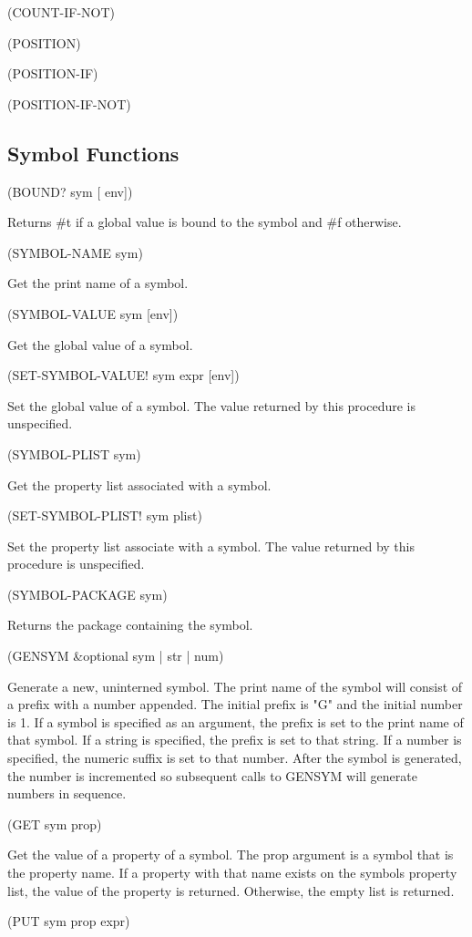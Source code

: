 \documentclass[11pt]{article}
\begin{document}
(COUNT-IF-NOT)

(POSITION)

(POSITION-IF)

(POSITION-IF-NOT)
\subsection{Symbol Functions}
\label{sec-1-18}

(BOUND? sym [ env])

Returns \#t if a global value is bound to the symbol and \#f otherwise.

(SYMBOL-NAME sym)

Get the print name of a symbol.

(SYMBOL-VALUE sym [env])

Get the global value of a symbol.

(SET-SYMBOL-VALUE! sym expr [env])

Set the global value of a symbol. The value returned by this procedure
is unspecified.

(SYMBOL-PLIST sym)

Get the property list associated with a symbol.

(SET-SYMBOL-PLIST! sym plist)

Set the property list associate with a symbol. The value returned by
this procedure is unspecified.

(SYMBOL-PACKAGE sym)

Returns the package containing the symbol.

(GENSYM \&optional sym | str | num)

Generate a new, uninterned symbol. The print name of the symbol will
consist of a prefix with a number appended. The initial prefix is "G"
and the initial number is 1. If a symbol is specified as an argument,
the prefix is set to the print name of that symbol. If a string is
specified, the prefix is set to that string. If a number is specified,
the numeric suffix is set to that number. After the symbol is generated,
the number is incremented so subsequent calls to GENSYM will generate
numbers in sequence.

(GET sym prop)

Get the value of a property of a symbol. The prop argument is a symbol
that is the property name. If a property with that name exists on the
symbols property list, the value of the property is returned. Otherwise,
the empty list is returned.

(PUT sym prop expr)
\end{document}
